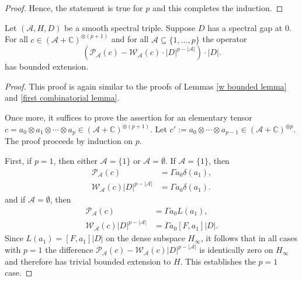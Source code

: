 \begin{proof}
        Hence, the statement is true for $p$ and this completes the induction.
    \end{proof}

    \begin{lem}\label{second combinatorial lemma} 
        Let $(\mathcal{A},H,D)$ be a smooth spectral triple. Suppose $D$ has a spectral gap at $0.$ For all $c\in(\mathcal{A}+\mathbb{C})^{\otimes (p+1)}$ and for all $\mathscr{A}\subseteq \{1,\ldots,p\}$ the operator
        \begin{equation*}
            \left(\mathcal{P}_{\mathscr{A}}(c)-\mathcal{W}_{\mathscr{A}}(c)\cdot |D|^{p-|\mathscr{A}|}\right)\cdot|D|.
        \end{equation*}
        has bounded extension.
    \end{lem}
    \begin{proof} 
        This proof is again similar to the proofs of Lemmas \ref{w bounded lemma} and \ref{first combinatorial lemma}.
        
        Once more, it suffices to prove the assertion for an elementary tensor $c = a_0\otimes a_1\otimes \cdots \otimes a_p \in (\mathcal{A}+\mathbb{C})^{\otimes(p+1)}$. Let $c' := a_0\otimes\cdots\otimes a_{p-1} \in (\mathcal{A}+\mathbb{C})^{\otimes p}$.
        The proof proceeds by induction on $p$.
        
        First, if $p = 1$, then either $\mathscr{A} = \{1\}$ or $\mathscr{A} = \emptyset$. If $\mathscr{A} = \{1\}$, then
        \begin{align*}
                         \mathcal{P}_{\mathscr{A}}(c) &= \Gamma a_0\delta(a_1),\\
            \mathcal{W}_{\mathscr{A}}(c)|D|^{p-|\mathscr{A}|} &= \Gamma a_0\delta(a_1).
        \end{align*}
        and if $\mathscr{A} = \emptyset$, then
        \begin{align*}
                         \mathcal{P}_{\mathscr{A}}(c) &= \Gamma a_0L(a_1),\\
            \mathcal{W}_{\mathscr{A}}(c)|D|^{p-|\mathscr{A}|} &= \Gamma a_0[F,a_1]|D|.
        \end{align*}
        Since $L(a_1) = [F,a_1]|D|$ on the dense subspace $H_\infty$, it follows that in all cases with $p = 1$ the difference $\mathcal{P}_{\mathscr{A}}(c)-\mathcal{W}_{\mathscr{A}}(c)|D|^{p-|\mathscr{A}|}$ is identically
        zero on $H_\infty$ and therefore has trivial bounded extension to $H$. This establishes the $p=1$ case.
        

\end{proof}
